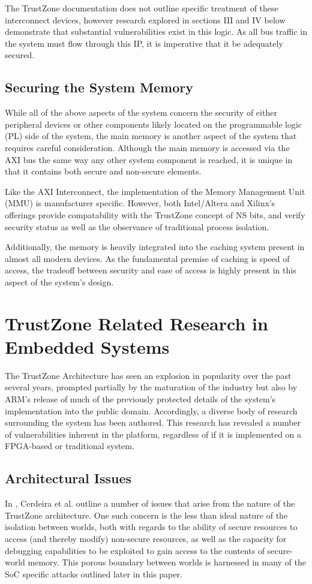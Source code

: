 \documentclass[journal]{IEEEtran}
\begin{document}
The TrustZone documentation does not outline specific treatment of these interconnect
devices, however research explored in sections III and IV below demonstrate that
substantial vulnerabilities exist in this logic. As all bus traffic in the system must
flow through this IP, it is imperative that it be adequately secured.

\subsection{Securing the System Memory}
While all of the above aspects of the system concern the security of either peripheral
devices or other components likely located on the programmable logic (PL) side of the 
system, the main memory is another aspect of the system that requires careful 
consideration. Although the main memory is accessed via the AXI bus the same way any other
system component is reached, it is unique in that it contains both secure and non-secure
elements.

Like the AXI Interconnect, the implementation of the Memory Management Unit (MMU) is
manufacturer specific. However, both Intel/Altera and Xilinx's offerings provide
compatability with the TrustZone concept of NS bits, and verify security status as well as
the observance of traditional process isolation. \cite{gross_breaking_2019}

Additionally, the memory is heavily integrated into the caching system present in almost
all modern devices. As the fundamental premise of caching is speed of access, the tradeoff
between security and ease of access is highly present in this aspect of the system's
design. 

\section{TrustZone Related Research in Embedded Systems}
The TrustZone Architecture has seen an explosion in popularity over the past several
years, prompted partially by the maturation of the industry but also by ARM's release of 
much of the previously protected details of the system's implementation into the public
domain. Accordingly, a diverse body of research surrounding the system has been authored.
This research has revealed a number of vulnerabilities inherent in the platform,
regardless of if it is implemented on a FPGA-based or traditional system.

\subsection{Architectural Issues}
In \cite{cerdeira_sok_nodate}, Cerdeira et al. outline a number of issues that arise from
the nature of the TrustZone architecture. One such concern is the less than ideal nature 
of the isolation between worlds, both with regards to the ability of secure resources to
access (and thereby modify) non-secure resources, as well as the capacity for debugging
capabilities to be exploited to gain access to the contents of secure-world memory. This
porous boundary between worlds is harnessed in many of the SoC specific attacks outlined
later in this paper.
\end{document}
